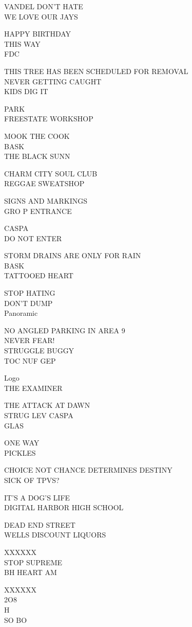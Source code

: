 \documentclass[10pt,letterpaper]{article}
\begin{document}
VANDEL DON'T HATE\\
WE LOVE OUR JAYS

HAPPY BIRTHDAY\\
THIS WAY\\
FDC

THIS TREE HAS BEEN SCHEDULED FOR REMOVAL\\
NEVER GETTING CAUGHT\\
KIDS DIG IT

PARK\\
FREESTATE WORKSHOP

MOOK THE COOK\\
BASK\\
THE BLACK SUNN

CHARM CITY SOUL CLUB\\
REGGAE SWEATSHOP

SIGNS AND MARKINGS\\
GRO P ENTRANCE

CASPA\\
DO NOT ENTER

STORM DRAINS ARE ONLY FOR RAIN\\
BASK\\
TATTOOED HEART

STOP HATING\\
DON'T DUMP\\
Panoramic

NO ANGLED PARKING IN AREA 9\\
NEVER FEAR!\\
STRUGGLE BUGGY\\
TOC NUF GEP

Logo\\
THE EXAMINER

THE ATTACK AT DAWN\\
STRUG LEV CASPA\\
GLAS

ONE WAY\\
PICKLES

CHOICE NOT CHANCE DETERMINES DESTINY\\
SICK OF TPVS?

IT'S A DOG'S LIFE\\
DIGITAL HARBOR HIGH SCHOOL

DEAD END STREET\\
WELLS DISCOUNT LIQUORS

XXXXXX\\
STOP SUPREME\\
BH HEART AM

XXXXXX\\
2O8\\
H\\
SO BO
\end{document}
